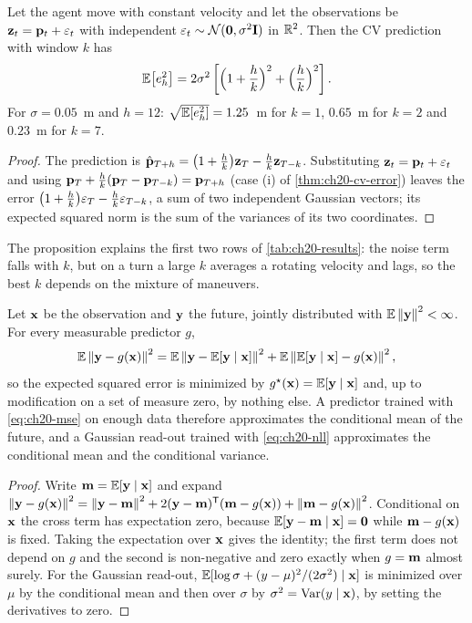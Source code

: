 \begin{proposition}
\label{thm:ch20-cv-noise}
Let the agent move with constant velocity and let the observations be
$\mathbf{z}_t = \mathbf{p}_t + \mathbf{\varepsilon}_t$ with independent $\mathbf{\varepsilon}_t \sim
\mathcal{N}(\mathbf{0}, \sigma^2\mathbf{I})$ in $\mathbb{R}^2$. Then the CV prediction with
window $k$ has
\[
  \mathbb{E}\bigl[e_h^2\bigr] = 2\sigma^2\left[\Bigl(1 + \frac{h}{k}\Bigr)^2 + \Bigl(\frac{h}{k}\Bigr)^2\right].
\]
For $\sigma = 0.05$~m and $h = 12$: $\sqrt{\mathbb{E}[e_h^2]} = 1.25$~m for $k = 1$,
$0.65$~m for $k = 2$ and $0.23$~m for $k = 7$.
\end{proposition}
\begin{proof}
The prediction is $\hat{\mathbf{p}}_{T+h} = \bigl(1 + \frac{h}{k}\bigr)\mathbf{z}_T -
\frac{h}{k}\mathbf{z}_{T-k}$. Substituting $\mathbf{z}_t = \mathbf{p}_t + \mathbf{\varepsilon}_t$ and
using $\mathbf{p}_T + \frac{h}{k}(\mathbf{p}_T - \mathbf{p}_{T-k}) = \mathbf{p}_{T+h}$ (case (i) of
\cref{thm:ch20-cv-error}) leaves the error $\bigl(1 +
\frac{h}{k}\bigr)\mathbf{\varepsilon}_T - \frac{h}{k}\mathbf{\varepsilon}_{T-k}$, a sum of two
independent Gaussian vectors; its expected squared norm is the sum of the
variances of its two coordinates.
\end{proof}

The proposition explains the first two rows of \cref{tab:ch20-results}: the
noise term falls with $k$, but on a turn a large $k$ averages a rotating
velocity and lags, so the best $k$ depends on the mixture of maneuvers.

\begin{theorem}
\label{thm:ch20-conditional-mean}
Let $\mathbf{x}$ be the observation and $\mathbf{y}$ the future, jointly
distributed with $\mathbb{E}\left\lVert \mathbf{y} \right\rVert^2 < \infty$. For every measurable
predictor $g$,
\[
  \mathbb{E}\left\lVert \mathbf{y} - g(\mathbf{x}) \right\rVert^2 = \mathbb{E}\left\lVert \mathbf{y} - \mathbb{E}[\mathbf{y} \mid \mathbf{x}] \right\rVert^2 + \mathbb{E}\left\lVert \mathbb{E}[\mathbf{y} \mid \mathbf{x}] - g(\mathbf{x}) \right\rVert^2,
\]
so the expected squared error is minimized by $g^\star(\mathbf{x}) =
\mathbb{E}[\mathbf{y} \mid \mathbf{x}]$ and, up to modification on a set of measure
zero, by nothing else. A predictor trained with
\cref{eq:ch20-mse} on enough data therefore approximates the conditional
mean of the future, and a Gaussian read-out trained with \cref{eq:ch20-nll}
approximates the conditional mean and the conditional
variance.
\end{theorem}
\begin{proof}
Write $\mathbf{m} = \mathbb{E}[\mathbf{y} \mid \mathbf{x}]$ and expand $\left\lVert \mathbf{y} -
g(\mathbf{x}) \right\rVert^2 = \left\lVert \mathbf{y} - \mathbf{m} \right\rVert^2 + 2(\mathbf{y} - \mathbf{m})^{\mathsf{T}}(\mathbf{m} -
g(\mathbf{x})) + \left\lVert \mathbf{m} - g(\mathbf{x}) \right\rVert^2$. Conditional on $\mathbf{x}$ the
cross term has expectation zero, because $\mathbb{E}[\mathbf{y} - \mathbf{m} \mid \mathbf{x}]
= \mathbf{0}$ while $\mathbf{m} - g(\mathbf{x})$ is fixed. Taking the expectation over
$\mathbf{x}$ gives the identity; the first term does not depend on $g$ and the
second is non-negative and zero exactly when $g = \mathbf{m}$ almost surely.
For the Gaussian read-out, $\mathbb{E}[\log\sigma + (y - \mu)^2/(2\sigma^2) \mid
\mathbf{x}]$ is minimized over $\mu$ by the conditional mean and then over
$\sigma$ by $\sigma^2 = \operatorname{Var}(y \mid \mathbf{x})$, by setting the derivatives to
zero.
\end{proof}

